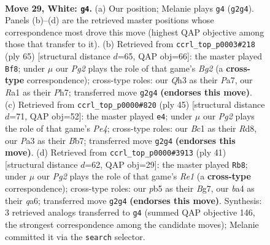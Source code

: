 \documentclass[11pt]{article}
\begin{document}
\clearpage

\begin{figure}[p]\centering
\begin{subfigure}{0.46\textwidth}\centering
\resizebox{\linewidth}{!}{%
\newchessgame
\chessboard[
  setfen={r3k3/b3n3/4p3/pp2q3/b1p5/P6Q/1P1NNPP1/R1B1K3 w - - 3 29},
  showmover=false,
  pgfstyle=straightmove, color=movearrow, markmove={g2-g4}
]}
\caption{}
\end{subfigure}\hfill
\begin{subfigure}{0.46\textwidth}\centering
\resizebox{\linewidth}{!}{%
\newchessgame
\chessboard[
  setfen={6k1/p4pbp/2q5/2p1r3/2Q1n1P1/P3B3/5PP1/3R1NK1 b - - 0 33},
  showmover=false,
  pgfstyle=straightmove, color=movearrow, markmove={g7-f8}
]}
\caption{}
\end{subfigure}
\\[4pt]
\begin{subfigure}{0.46\textwidth}\centering
\resizebox{\linewidth}{!}{%
\newchessgame
\chessboard[
  setfen={3r2k1/pb1n1p2/2q3pQ/4p3/2p5/P1N1PP2/1P4PP/4KB1R b K - 0 23},
  showmover=false,
  pgfstyle=straightmove, color=movearrow, markmove={e5-e4}
]}
\caption{}
\end{subfigure}\hfill
\begin{subfigure}{0.46\textwidth}\centering
\resizebox{\linewidth}{!}{%
\newchessgame
\chessboard[
  setfen={4r1k1/2pqnpbp/Q5p1/2B5/2BP4/4PP2/5P1P/4K2R b K - 2 21},
  showmover=false,
  pgfstyle=straightmove, color=movearrow, markmove={e8-b8}
]}
\caption{}
\end{subfigure}
\caption{\textbf{Move 29, White: \texttt{g4}.} (a) Our position; Melanie plays \texttt{g4} (\texttt{g2g4}). Panels (b)--(d) are the retrieved master positions whose correspondence most drove this move (highest QAP objective among those that transfer to it). (b) Retrieved from \texttt{ccrl\_top\_p0003\#218} (ply 65) [structural distance $d$=65, QAP obj=66]: the master played \texttt{Bf8}; under $\mu$ our \emph{Pg2} plays the role of that game's \emph{Bg2} (a \textbf{cross-type} correspondence); cross-type roles: our \emph{Q}h3 as their \emph{P}a7, our \emph{R}a1 as their \emph{P}h7; transferred move \texttt{g2g4} \textbf{(endorses this move)}. (c) Retrieved from \texttt{ccrl\_top\_p0000\#820} (ply 45) [structural distance $d$=71, QAP obj=52]: the master played \texttt{e4}; under $\mu$ our \emph{Pg2} plays the role of that game's \emph{Pe4}; cross-type roles: our \emph{B}c1 as their \emph{R}d8, our \emph{P}a3 as their \emph{B}b7; transferred move \texttt{g2g4} \textbf{(endorses this move)}. (d) Retrieved from \texttt{ccrl\_top\_p0000\#3913} (ply 41) [structural distance $d$=62, QAP obj=29]: the master played \texttt{Rb8}; under $\mu$ our \emph{Pg2} plays the role of that game's \emph{Re1} (a \textbf{cross-type} correspondence); cross-type roles: our \emph{p}b5 as their \emph{B}g7, our \emph{b}a4 as their \emph{q}a6; transferred move \texttt{g2g4} \textbf{(endorses this move)}. Synthesis: 3 retrieved analogs transferred to \texttt{g4} (summed QAP objective 146, the strongest correspondence among the candidate moves); Melanie committed it via the \texttt{search} selector.}
\label{fig:thought-m56}
\end{figure}
\end{document}
